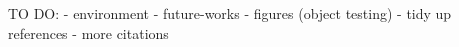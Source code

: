 TO DO:
- environment
- future-works
- figures (object testing)
- tidy up references
- more citations
